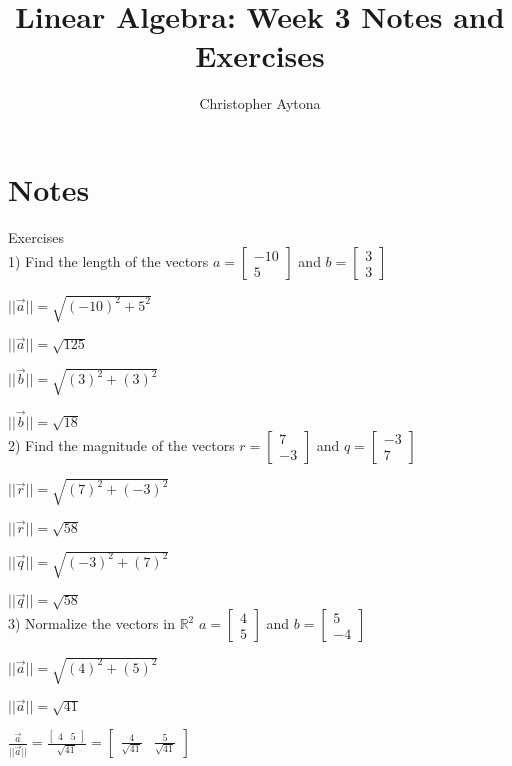 \documentclass[a4paper]{article}
\begin{document}
\title{Linear Algebra: Week 3 Notes and Exercises}
\author{Christopher Aytona}
\maketitle

\section{Notes}
Exercises\\

1) Find the length of the vectors $a = \begin{bmatrix}
-10\\
5
\end{bmatrix}$ and $b = \begin{bmatrix}
3\\
3
\end{bmatrix}$

$||\vec{a}|| = \sqrt{(-10)^2+5^2}$

$||\vec{a}|| = \sqrt{125}$

$||\vec{b}|| = \sqrt{(3)^2+(3)^2}$

$||\vec{b}|| = \sqrt{18}$\\

2) Find the magnitude of the vectors $r = \begin{bmatrix}
7\\
-3
\end{bmatrix}$ and $q = \begin{bmatrix}
-3\\
7
\end{bmatrix}$

$||\vec{r}|| = \sqrt{(7)^2+(-3)^2}$

$||\vec{r}|| = \sqrt{58}$

$||\vec{q}|| = \sqrt{(-3)^2+(7)^2}$

$||\vec{q}|| = \sqrt{58}$\\

3) Normalize the vectors in $\mathbb{R}^2$ $a = \begin{bmatrix}
4\\
5
\end{bmatrix}$ and $b = \begin{bmatrix}
5\\
-4
\end{bmatrix}$

$||\vec{a}|| = \sqrt{(4)^2+(5)^2}$

$||\vec{a}|| = \sqrt{41}$

$\frac{\vec{a}}{||\vec{a}||} = \frac{\begin{bmatrix}
4&5
\end{bmatrix}}{\sqrt{41}} = \begin{bmatrix}
\frac{4}{\sqrt{41}}&\frac{5}{\sqrt{41}}
\end{bmatrix}$
\end{document}
